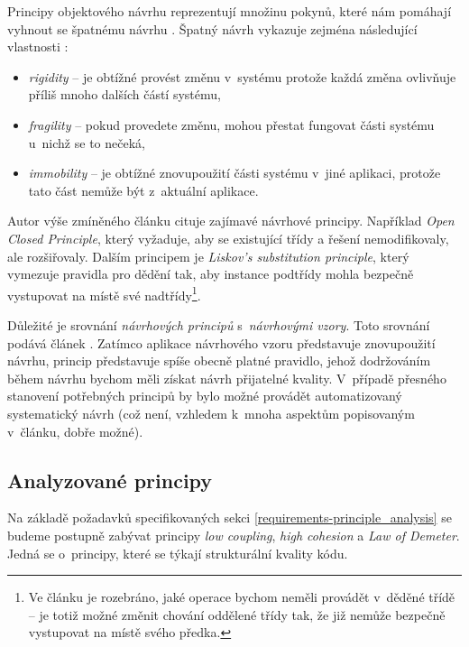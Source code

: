Principy objektového návrhu reprezentují množinu pokynů, které nám pomáhají vyhnout se špatnému návrhu \cite{oop_design_principles}. Špatný návrh vykazuje zejména následující vlastnosti \cite{oop_design_principles_and_patterns}:

\begin{itemize}
\item \emph{rigidity} -- je obtížné provést změnu v~systému protože každá změna ovlivňuje příliš mnoho dalších částí systému,
\item \emph{fragility} -- pokud provedete změnu, mohou přestat fungovat části systému u~nichž se to nečeká,
\item \emph{immobility} -- je obtížné znovupoužití části systému v~jiné aplikaci, protože tato část nemůže být  z~aktuální aplikace.
\end{itemize}

Autor výše zmíněného článku \cite{oop_design_principles_and_patterns} cituje zajímavé návrhové principy. Například \emph{Open Closed Principle}, který vyžaduje, aby se existující třídy a řešení nemodifikovaly, ale rozšiřovaly. Dalším principem je \emph{Liskov's substitution principle}, který vymezuje pravidla pro dědění tak, aby instance podtřídy mohla bezpečně vystupovat na místě své nadtřídy\footnote{Ve článku je rozebráno, jaké operace bychom neměli provádět v~děděné třídě -- je totiž možné změnit chování oddělené třídy tak, že již nemůže bezpečně vystupovat na místě svého předka.}.

Důležité je srovnání \emph{návrhových principů} s~\emph{návrhovými vzory}. Toto srovnání podává článek \cite{612257}. Zatímco aplikace návrhového vzoru představuje znovupoužití  návrhu, princip představuje spíše obecně platné pravidlo, jehož dodržováním během návrhu bychom měli získat návrh přijatelné kvality. V~případě přesného stanovení potřebných principů by bylo možné provádět automatizovaný systematický návrh (což není, vzhledem k~mnoha aspektům popisovaným v~článku, dobře možné).

\subsection{Analyzované principy}
\label{analysis-principles_analyzed}
Na základě požadavků specifikovaných sekci \ref{requirements-principle_analysis} se budeme postupně zabývat principy \emph{low coupling}, \emph{high cohesion} a \emph{Law of Demeter}. Jedná se o~principy, které se týkají strukturální kvality kódu.

